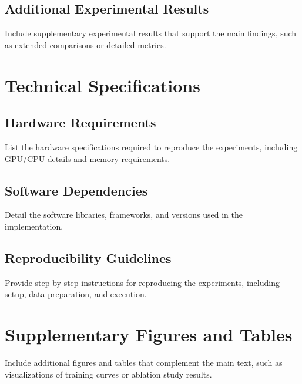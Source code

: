 \documentclass[
	english,
	ruledheaders=section,
	class=report,
	thesis={type=master},
	accentcolor=9c,
	custommargins=true,
	marginpar=false,
	parskip=half-,
	fontsize=11pt,
]{tudapub}
\begin{document}
\section{Additional Experimental Results}
\label{app:additional_results}
Include supplementary experimental results that support the main findings, such as extended comparisons or detailed metrics.

\chapter{Technical Specifications}
\label{app:technical_specs}

\section{Hardware Requirements}
\label{app:hardware_requirements}
List the hardware specifications required to reproduce the experiments, including GPU/CPU details and memory requirements.

\section{Software Dependencies}
\label{app:software_dependencies}
Detail the software libraries, frameworks, and versions used in the implementation.

\section{Reproducibility Guidelines}
\label{app:reproducibility}
Provide step-by-step instructions for reproducing the experiments, including setup, data preparation, and execution.

\chapter{Supplementary Figures and Tables}
Include additional figures and tables that complement the main text, such as visualizations of training curves or ablation study results.
\label{app:supplementary}
\end{document}
